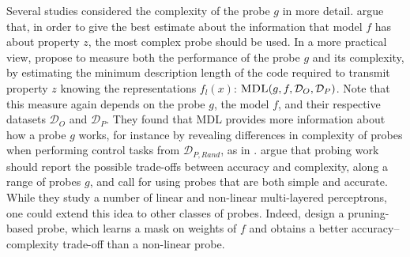 \documentclass[discussion]{clv3}
\begin{document}
Several studies considered the complexity of the probe $g$ in more detail. \citet{pimentel-etal-2020-information} argue that, in order to give the best estimate about the information that model $f$ has about property $z$, the most complex probe should be used. 
In a more practical view, \citet{voita-titov-2020-information} propose to measure both the performance of the probe $g$ and its complexity, by estimating the minimum description length of the code required to transmit property $z$ knowing the representations $f_l(x)$: 
$\textsc{MDL}(g, f, \mathcal{D}_O, \mathcal{D}_P)$.
Note that this measure again depends on the probe $g$, the model $f$, and their respective datasets $\mathcal{D}_O$ and  $\mathcal{D}_P$. 
They found that MDL provides more information about how a probe $g$ works, for instance by revealing differences in complexity of probes when performing control tasks from $\mathcal{D}_{P,Rand}$, as in \citet{hewitt-liang-2019-designing}. 
 \citet{pimentel-etal-2020-pareto} argue that probing work should report the possible trade-offs between accuracy and complexity, along a range of probes $g$, and call for using probes that are both simple and accurate. 
While they study a number of linear and  non-linear multi-layered perceptrons, one could extend this idea to other classes of probes. Indeed, \citet{cao2021low} design a pruning-based probe, which learns a mask on weights of $f$ and obtains a  better accuracy--complexity trade-off than a non-linear probe. 

 
\end{document}
